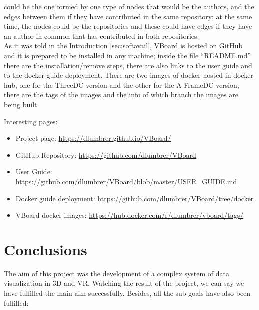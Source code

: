 \documentclass[a4paper, 12pt]{book}
\begin{document}
could be the one formed by one type of nodes that would be the authors, and the edges between them if they have contributed in the same repository; at the same time, the nodes could be the repositories and these could have edges if they have an author in common that has contributed in both repositories.\\

As it was told in the Introduction \ref{sec:softavail}, VBoard is hosted on GitHub and it is prepared to be installed in any machine; inside the file “README.md” there are the installation/remove steps, there are also links to the user guide and to the docker guide deployment. There are two images of docker hosted in docker-hub, one for the ThreeDC version and the other for the A-FrameDC version, there are the tags of the images and the info of which branch the images are being built.

Interesting pages:

\begin{itemize}
\item Project page: \url{https://dlumbrer.github.io/VBoard/}
\item GitHub Repository: \url{https://github.com/dlumbrer/VBoard}
\item User Guide: \url{https://github.com/dlumbrer/VBoard/blob/master/USER_GUIDE.md}
\item Docker guide deployment: \url{https://github.com/dlumbrer/VBoard/tree/docker}
\item VBoard docker images: \url{https://hub.docker.com/r/dlumbrer/vboard/tags/}
\end{itemize}


\cleardoublepage
\chapter{Conclusions}
\label{chap:conclusions}
The aim of this project was the development of a complex system of data visualization in 3D and VR. Watching the result of the project, we can say we have fulfilled the main aim successfully. Besides, all the sub-goals have also been fulfilled:
\end{document}
